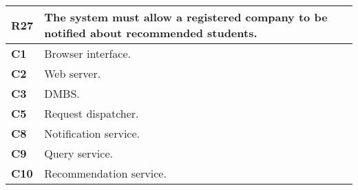 \begin{table}[H]
    \centering
    \begin{tabular}{|l|m{10cm}|}
        \hline \textbf{R27} & The system must allow a registered company to be notified about recommended students.\\
        \hline \textbf{C1} & Browser interface. \\
        \hline \textbf{C2} & Web server. \\
        \hline \textbf{C3} & DMBS. \\
        \hline \textbf{C5} & Request dispatcher. \\
        \hline \textbf{C8} & Notification service. \\
        \hline \textbf{C9} & Query service. \\
        \hline \textbf{C10} & Recommendation service. \\
        \hline
    \end{tabular}
\end{table}

